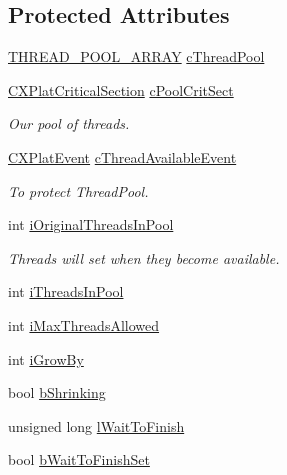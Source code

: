 \subsection*{\-Protected \-Attributes}
\begin{DoxyCompactItemize}
\item 
\hyperlink{_c_x_plat_thread_pool_8h_a615ef31b69376a699fb98bdaa7a643af}{\-T\-H\-R\-E\-A\-D\-\_\-\-P\-O\-O\-L\-\_\-\-A\-R\-R\-A\-Y} \hyperlink{class_c_x_plat_thread_pool_a64c478883d5d6d7f3a21ef87e9203b8d}{c\-Thread\-Pool}
\item 
\hyperlink{class_c_x_plat_critical_section}{\-C\-X\-Plat\-Critical\-Section} \hyperlink{class_c_x_plat_thread_pool_aa7ae22263bf54d6d7916bb332a63cb36}{c\-Pool\-Crit\-Sect}
\begin{DoxyCompactList}\small\item\em \-Our pool of threads. \end{DoxyCompactList}\item 
\hyperlink{class_c_x_plat_event}{\-C\-X\-Plat\-Event} \hyperlink{class_c_x_plat_thread_pool_a1c511e13b5f134b91494411a20fa1caa}{c\-Thread\-Available\-Event}
\begin{DoxyCompactList}\small\item\em \-To protect \-Thread\-Pool. \end{DoxyCompactList}\item 
int \hyperlink{class_c_x_plat_thread_pool_ad48b1855b53944a36387466ec4edf075}{i\-Original\-Threads\-In\-Pool}
\begin{DoxyCompactList}\small\item\em \-Threads will set when they become available. \end{DoxyCompactList}\item 
int \hyperlink{class_c_x_plat_thread_pool_a2ee5c38caa32b73ea9ccb2688edbebd3}{i\-Threads\-In\-Pool}
\item 
int \hyperlink{class_c_x_plat_thread_pool_aa68b8ad1860d7e86bb6030046876ac9e}{i\-Max\-Threads\-Allowed}
\item 
int \hyperlink{class_c_x_plat_thread_pool_af241301a871a1468678540d48fcc9985}{i\-Grow\-By}
\item 
bool \hyperlink{class_c_x_plat_thread_pool_a28a2f5949bf10ec0eb0db3a65a4ade1f}{b\-Shrinking}
\item 
unsigned long \hyperlink{class_c_x_plat_thread_pool_a29b4385ed2ab6e48190f2f8ebcd656a2}{l\-Wait\-To\-Finish}
\item 
bool \hyperlink{class_c_x_plat_thread_pool_a119623bf09e081406a80ce845c7a8f4f}{b\-Wait\-To\-Finish\-Set}
\end{DoxyCompactItemize}

